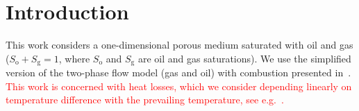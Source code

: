 \section{Introduction}

This work considers a one-dimensional porous medium saturated with
oil and gas ($S_\text{o}+S_\text{g}=1$, where $S_\text{o}$ and
$S_\text{g}$ are oil and gas saturations).
We use the simplified version of the two-phase flow model (gas and
oil) with combustion presented in~\cite{gargar2020combustion}.
\textcolor{red}{
	This work is concerned with heat losses, which we
	consider depending linearly on temperature difference with the
	prevailing temperature, see e.g.~\cite{AKKUTLU2003229}.
}

